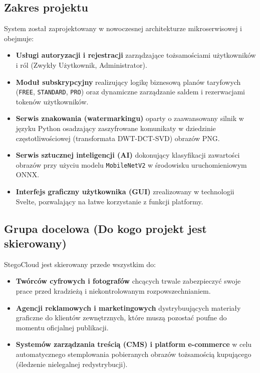 \documentclass[12pt,a4paper]{article}
\begin{document}
\subsection{Zakres projektu}
System został zaprojektowany w nowoczesnej architekturze mikroserwisowej i obejmuje:
\begin{itemize}
    \item \textbf{Usługi autoryzacji i rejestracji} zarządzające tożsamościami użytkowników i ról (Zwykły Użytkownik, Administrator).
    \item \textbf{Moduł subskrypcyjny} realizujący logikę biznesową planów taryfowych (\texttt{FREE}, \texttt{STANDARD}, \texttt{PRO}) oraz dynamiczne zarządzanie saldem i rezerwacjami tokenów użytkowników.
    \item \textbf{Serwis znakowania (watermarkingu)} oparty o zaawansowany silnik w języku Python osadzający zaszyfrowane komunikaty w dziedzinie częstotliwościowej (transformata DWT-DCT-SVD) obrazów PNG.
    \item \textbf{Serwis sztucznej inteligencji (AI)} dokonujący klasyfikacji zawartości obrazów przy użyciu modelu \texttt{MobileNetV2} w środowisku uruchomieniowym ONNX.
    \item \textbf{Interfejs graficzny użytkownika (GUI)} zrealizowany w technologii Svelte, pozwalający na łatwe korzystanie z funkcji platformy.
\end{itemize}

\subsection{Grupa docelowa (Do kogo projekt jest skierowany)}
StegoCloud jest skierowany przede wszystkim do:
\begin{itemize}
    \item \textbf{Twórców cyfrowych i fotografów} chcących trwale zabezpieczyć swoje prace przed kradzieżą i niekontrolowanym rozpowszechnianiem.
    \item \textbf{Agencji reklamowych i marketingowych} dystrybuujących materiały graficzne do klientów zewnętrznych, które muszą pozostać poufne do momentu oficjalnej publikacji.
    \item \textbf{Systemów zarządzania treścią (CMS) i platform e-commerce} w celu automatycznego stemplowania pobieranych obrazów tożsamością kupującego (śledzenie nielegalnej redystrybucji).
\end{itemize}

\newpage

\end{document}
